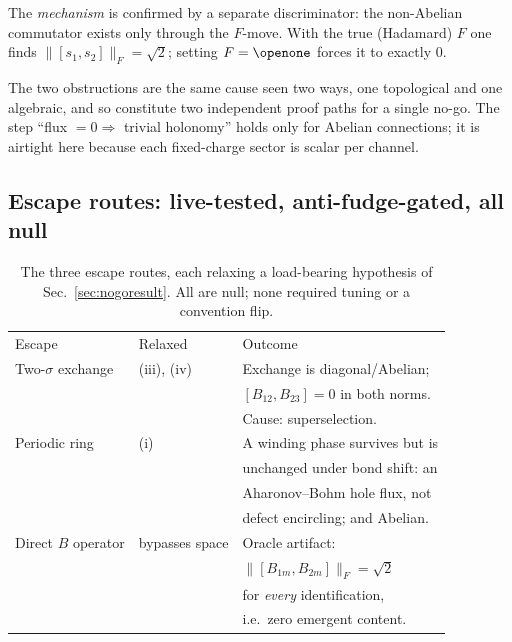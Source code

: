 \documentclass[aps,pra,twocolumn,superscriptaddress,longbibliography,floatfix,nofootinbib]{revtex4-2}
\newcommand{\Id}{\openone}
\newcommand{\Fnorm}[1]{\lVert #1 \rVert_{F}}
\begin{document}
The \emph{mechanism} is confirmed by a separate discriminator: the non-Abelian
commutator exists only through the $F$-move. With the true (Hadamard) $F$ one
finds $\Fnorm{[s_1,s_2]}=\sqrt2$; setting $F=\Id$ forces it to exactly $0$.

The two obstructions are the same cause seen two ways, one topological and one
algebraic, and so constitute two independent proof paths for a single no-go.
The step ``flux $=0 \Rightarrow$ trivial holonomy'' holds only for Abelian
connections; it is airtight here because each fixed-charge sector is scalar per
channel.

\subsection{Escape routes: live-tested, anti-fudge-gated, all null}
\label{sec:escapes}

\begin{table}[tbp]
\caption{\label{tab:escapes}The three escape routes, each relaxing a
load-bearing hypothesis of Sec.~\ref{sec:nogoresult}. All are null; none
required tuning or a convention flip.}
\begin{ruledtabular}
\scriptsize
\begin{tabular}{lll}
Escape & Relaxed & Outcome \\
\colrule
Two-$\sigma$ exchange & (iii), (iv) & Exchange is diagonal/Abelian; \\
 & & $[B_{12},B_{23}]=0$ in both norms. \\
 & & Cause: superselection. \\
Periodic ring & (i) & A winding phase survives but is \\
 & & unchanged under bond shift: an \\
 & & Aharonov--Bohm hole flux, not \\
 & & defect encircling; and Abelian. \\
Direct $B$ operator & bypasses space & Oracle artifact: \\
 & & $\Fnorm{[B_{1m},B_{2m}]}=\sqrt2$ \\
 & & for \emph{every} identification, \\
 & & i.e.\ zero emergent content. \\
\end{tabular}
\end{ruledtabular}
\end{table}
\end{document}
